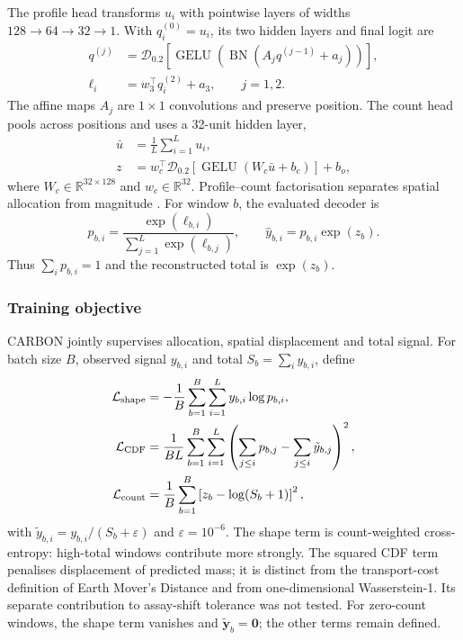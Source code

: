 \documentclass[webpdf,contemporary,large]{oup-authoring-template}
\begin{document}
The profile head transforms $u_i$ with pointwise layers of widths $128\rightarrow64\rightarrow32\rightarrow1$. With $q_i^{(0)}=u_i$, its two hidden layers and final logit are
\begin{equation}
\begin{aligned}
q^{(j)}&=\mathcal D_{0.2}\!\left[
\operatorname{GELU}\!\left(\operatorname{BN}(A_jq^{(j-1)}+a_j)\right)\right],\\
\ell_i&=w_3^\top q_i^{(2)}+a_3,\qquad j=1,2.
\end{aligned}
\label{eq:profile_head}
\end{equation}
The affine maps $A_j$ are $1\times1$ convolutions and preserve position. The count head pools across positions and uses a 32-unit hidden layer,
\begin{equation}
\begin{aligned}
\bar u&=\frac1L\sum_{i=1}^{L}u_i,\\
z&=w_c^\top\mathcal D_{0.2}\!\left[
\operatorname{GELU}(W_c\bar u+b_c)\right]+b_o,
\end{aligned}
\label{eq:count_head}
\end{equation}
where $W_c\in\mathbb R^{32\times128}$ and $w_c\in\mathbb R^{32}$. Profile--count factorisation separates spatial allocation from magnitude \citep{avsec2021bpnet}. For window $b$, the evaluated decoder is
\begin{equation}
p_{b,i}=\frac{\exp(\ell_{b,i})}{\sum_{j=1}^{L}\exp(\ell_{b,j})},
\qquad \hat y_{b,i}=p_{b,i}\exp(z_b).
\label{eq:dual_head_decode}
\end{equation}
Thus $\sum_i p_{b,i}=1$ and the reconstructed total is $\exp(z_b)$.

\subsubsection{Training objective}\label{subsec:loss}

CARBON jointly supervises allocation, spatial displacement and total signal. For batch size $B$, observed signal $y_{b,i}$ and total $S_b=\sum_i y_{b,i}$, define
\begin{align}
\mathcal L_{\rm shape}
&=-\frac1B\sum_{b=1}^{B}\sum_{i=1}^{L}y_{b,i}\log p_{b,i},
\label{eq:shape_loss}\\
\mathcal L_{\rm CDF}
&=\frac1{BL}\sum_{b=1}^{B}\sum_{i=1}^{L}
\left(\sum_{j\leq i}p_{b,j}-\sum_{j\leq i}\tilde y_{b,j}\right)^2,
\label{eq:cdf_loss}\\
\mathcal L_{\rm count}
&=\frac1B\sum_{b=1}^{B}\left[z_b-\log(S_b+1)\right]^2,
\label{eq:main_count_loss}
\end{align}
with $\tilde y_{b,i}=y_{b,i}/(S_b+\varepsilon)$ and $\varepsilon=10^{-6}$. The shape term is count-weighted cross-entropy: high-total windows contribute more strongly. The squared CDF term penalises displacement of predicted mass; it is distinct from the transport-cost definition of Earth Mover's Distance \citep{rubner2000emd} and from one-dimensional Wasserstein-1. Its separate contribution to assay-shift tolerance was not tested. For zero-count windows, the shape term vanishes and $\tilde{\mathbf y}_b=\mathbf0$; the other terms remain defined.
\end{document}

